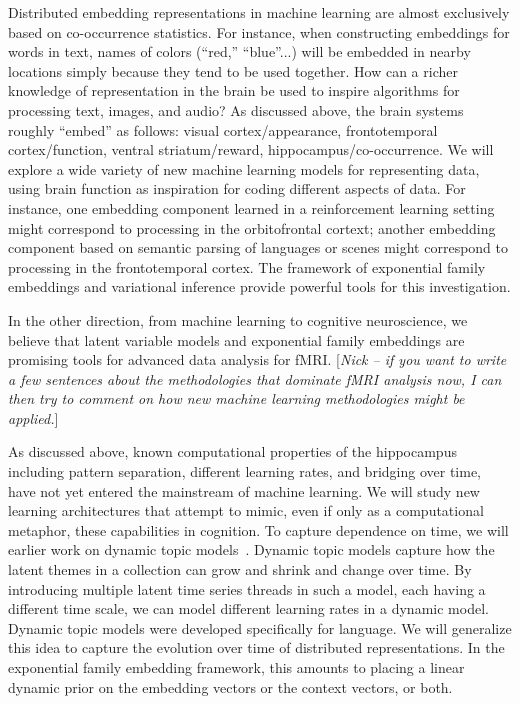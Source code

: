 Distributed embedding representations in machine learning are almost
exclusively based on co-occurrence statistics. For instance, when
constructing embeddings for words in text, names of colors (``red,''
``blue''...) will be embedded in nearby locations simply because they
tend to be used together. How can a richer knowledge of representation
in the brain be used to inspire algorithms for processing text,
images, and audio? As discussed above, the brain systems roughly
``embed'' as follows: visual cortex/appearance, frontotemporal
cortex/function, ventral striatum/reward, hippocampus/co-occurrence.
We will explore a wide variety of new machine learning models 
for representing data, using brain function as inspiration
for coding different aspects of data. For instance,
one embedding component learned in a reinforcement learning
setting might correspond to processing in the orbitofrontal cortext;
another embedding component based on semantic parsing of 
languages or scenes might correspond to processing in
the frontotemporal cortex. 
The framework of exponential family embeddings and variational
inference provide powerful tools for this investigation.


In the other direction, from machine learning to cognitive
neuroscience, we believe that latent variable models and exponential family embeddings are
promising tools for advanced data analysis for fMRI.
[{\it Nick -- if you want to write a few sentences about the methodologies
that dominate fMRI analysis now, I can then try to comment on
how new machine learning methodologies might be applied.}]


As discussed above, known computational properties of the hippocampus
including pattern separation, different learning rates, and bridging
over time, have not yet entered the mainstream of machine learning.
We will study new learning architectures that attempt to mimic, even
if only as a computational metaphor, these capabilities in cognition.
To capture dependence on time, we will earlier work on dynamic topic
models~\citep{Blei:2006d}.  Dynamic topic models capture how the
latent themes in a collection can grow and shrink and change over
time.  By introducing multiple latent time series threads in such a
model, each having a different time scale, we can model different
learning rates in a dynamic model.  Dynamic topic models were
developed specifically for language.  We will generalize this idea to
capture the evolution over time of distributed representations.  In
the exponential family embedding framework, this amounts to placing a
linear dynamic prior on the embedding vectors or the context vectors,
or both.
